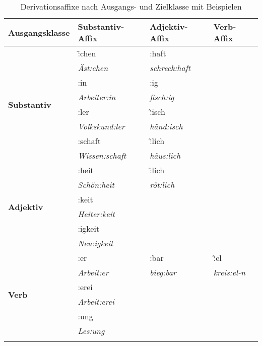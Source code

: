 \begin{table}[!htbp]
  \centering
  \begin{tabular}{llll}
    \lsptoprule
    \textbf{Ausgangsklasse} & \textbf{Substantiv-Affix} & \textbf{Adjektiv-Affix} & \textbf{Verb-Affix} \\
   \midrule
   \multirow{8}{*}{\textbf{Substantiv}} & \~:chen & :haft & \\
   & \textit{Äst:chen} & \textit{schreck:haft} & \\
   \cmidrule{2-4}
   
   & :in & :ig & \\
   & \textit{Arbeiter:in} & \textit{fisch:ig} & \\
   \cmidrule{2-4}
   
   & :ler & \~:isch & \\
   & \textit{Volkskund:ler} & \textit{händ:isch} & \\
   \cmidrule{2-4}
   
   & :schaft & \~:lich & \\
   & \textit{Wissen:schaft} & \textit{häus:lich} & \\
   
   \midrule
   \multirow{6}{*}{\textbf{Adjektiv}} & :heit & \~:lich & \\
   & \textit{Schön:heit} & \textit{röt:lich} & \\
   \cmidrule{2-4}
   
   & :keit && \\
   & \textit{Heiter:keit} & & \\
   \cmidrule{2-4}
   
   & :igkeit && \\
   & \textit{Neu:igkeit} & & \\
   
   \midrule
   \multirow{6}{*}{\textbf{Verb}} & :er & :bar & \~:el \\
   & \textit{Arbeit:er} & \textit{bieg:bar} & \textit{kreis:el-n} \\
   \cmidrule{2-4}
   
   & :erei && \\
   & \textit{Arbeit:erei} & & \\
   \cmidrule{2-4}
   
   & :ung && \\
   & \textit{Les:ung} & & \\
   
   \lspbottomrule
  \end{tabular}
  \caption{Derivationsaffixe nach Ausgangs- und Zielklasse mit Beispielen}
  \label{tab:derivationmitwortklassenwechsel051}
\end{table}

